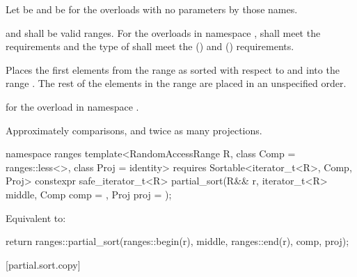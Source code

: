\begin{itemdescr}
\pnum
Let  be 
and  be 
for the overloads with no parameters by those names.

\pnum
\requires
{} and  shall be valid ranges.
For the overloads in namespace ,
 shall meet the
 requirements and
the type of  shall meet the
 () and
 () requirements.

\pnum
\effects
Places the first
elements from the range
 as sorted with respect to  and 
into the range
.
The rest of the elements in the range
are placed in an unspecified order.
%

\pnum
\returns
{} for the overload in namespace .

\pnum
\complexity
Approximately
comparisons, and twice as many projections.
\end{itemdescr}

\begin{itemdecl}
namespace ranges {
  template<RandomAccessRange R, class Comp = ranges::less<>, class Proj = identity>
    requires Sortable<iterator_t<R>, Comp, Proj>
    constexpr safe_iterator_t<R>
      partial_sort(R&& r, iterator_t<R> middle, Comp comp = {}, Proj proj = {});
}
\end{itemdecl}

\begin{itemdescr}
\pnum
\effects Equivalent to:
\begin{codeblock}
return ranges::partial_sort(ranges::begin(r), middle, ranges::end(r), comp, proj);
\end{codeblock}
\end{itemdescr}

[partial.sort.copy]{}

